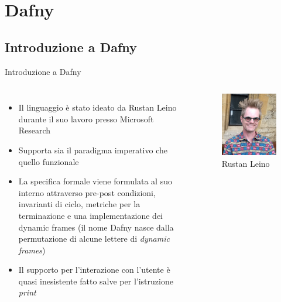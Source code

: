 \documentclass[]{beamer}
\begin{document}
\section{Dafny}
\subsection{Introduzione a Dafny}
\begin{frame}{Introduzione a Dafny}
\begin{columns}[onlytextwidth]
\begin{itemize}
    \item Il linguaggio è stato ideato da Rustan Leino durante il suo lavoro presso Microsoft Research
    \item Supporta sia il paradigma imperativo che quello funzionale
    \item La specifica formale viene formulata al suo interno attraverso pre-post condizioni, invarianti di ciclo, metriche per la terminazione e una implementazione dei dynamic frames (il nome Dafny nasce dalla permutazione di alcune lettere di \textit{dynamic frames})
    \item Il supporto per l'interazione con l'utente è quasi inesistente fatto salve per l'istruzione \textit{print}
\end{itemize}
\begin{figure}
    \centering
    \includegraphics[scale=0.2]{assets/img/Rustan-feature.jpg}
    \caption{Rustan Leino}
    \label{fig:my_label}
\end{figure}
\end{columns}
\end{frame}
\end{document}

